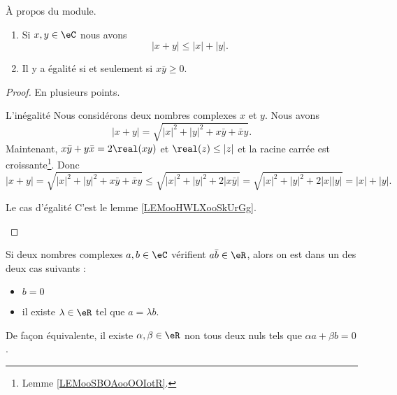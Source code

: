 \begin{lemma}       \label{LEMooRJICooYrcAFv}
    À propos du module.
    \begin{enumerate}
        \item       \label{ITEMooCTHXooHqzuvb}
            Si \( x,y\in \eC\) nous avons
    \begin{equation}
        | x+y |\leq | x |+| y |.
    \end{equation}
        \item
            Il y a égalité si et seulement si \( x\bar y\geq 0\).
    \end{enumerate}
\end{lemma}

\begin{proof}
    En plusieurs points.
    \begin{subproof}
    \item[L'inégalité]
            Nous considérons deux nombres complexes \( x\) et \( y\). Nous avons
            \begin{equation}
                | x+y |=\sqrt{ | x |^2+| y |^2+x\bar y+\bar xy }.
            \end{equation}
            Maintenant, \( x\bar y+y\bar x=2\real(xy)\) et \( \real(z)\leq | z |\) et la racine carrée est croissante\footnote{Lemme \ref{LEMooSBOAooOOIotR}.}. Donc
            \begin{equation}
                | x+y |=\sqrt{ | x |^2+| y |^2+x\bar y+\bar xy }\leq \sqrt{ | x |^2+| y |^2+2| x\bar y | }=\sqrt{ | x |^2+| y |^2+2| x | |y | }=| x |+| y |.
            \end{equation}
        \item[Le cas d'égalité]
            C'est le lemme \ref{LEMooHWLXooSkUrGg}.
    \end{subproof}
\end{proof}

\begin{lemma}       \label{LEMooXJBJooFDmhnV}
    Si deux nombres complexes \( a,b\in \eC\) vérifient \( a\bar b\in \eR\), alors on est dans un des deux cas suivants :
    \begin{itemize}
        \item \( b=0\)
        \item il existe \( \lambda\in \eR\) tel que \( a=\lambda b\).
    \end{itemize}
    De façon équivalente, il existe \( \alpha,\beta\in \eR\) non tous deux nuls tels que \( \alpha a+\beta b=0\).
\end{lemma}

